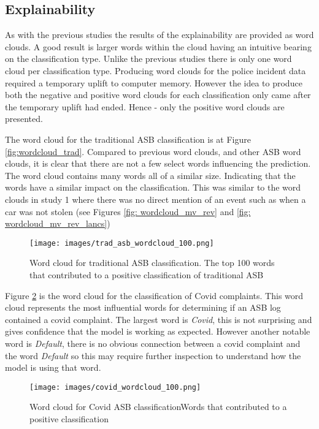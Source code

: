 \subsection{Explainability} As with the previous studies the results of the explainability are provided as word clouds. A good result is larger words within the cloud having an intuitive bearing on the classification type. Unlike the previous studies there is only one word cloud per classification type. Producing word clouds for the police incident data required a temporary uplift to computer memory. However the idea to  produce both the negative and positive word clouds for each classification only came after the temporary uplift had ended. Hence - only the positive word clouds are presented. 

The word cloud for the traditional ASB classification is at Figure \ref{fig:wordcloud_trad}. Compared to previous word clouds, and other ASB word clouds, it is clear that there are not a few select words influencing the prediction. The word cloud contains many words all of a similar size. Indicating that the words have a similar impact on the classification. This was similar to the word clouds in study 1 where there was no direct mention of an event such as when a car was not stolen (see Figures \ref{fig: wordcloud_mv_rev} and \ref{fig: wordcloud_mv_rev_lancs})

\begin{figure}[h]
    \texttt{[image: images/trad\_asb\_wordcloud\_100.png]}
    \caption{{Word cloud for traditional ASB classification.} The top 100 words that contributed to a positive classification of traditional ASB}
    \label{fig: wordcloud_trad}
\end{figure}

Figure \ref{fig: wordcloud_covid} is the word cloud for the classification of Covid complaints. This word cloud represents the most influential words for determining if an ASB log contained a covid complaint. The largest word is \emph{Covid}, this is not surprising and gives confidence that the model is working as expected. However another notable word is \emph{Default}, there is no obvious connection between a covid complaint and the word \emph{Default}  so this may require further inspection to understand how the model is using that word.


\begin{figure}[h]
    \centering
    \texttt{[image: images/covid\_wordcloud\_100.png]}
    \caption{{Word cloud for Covid ASB classification}Words that contributed to a positive classification}
    \label{fig: wordcloud_covid}
\end{figure}

